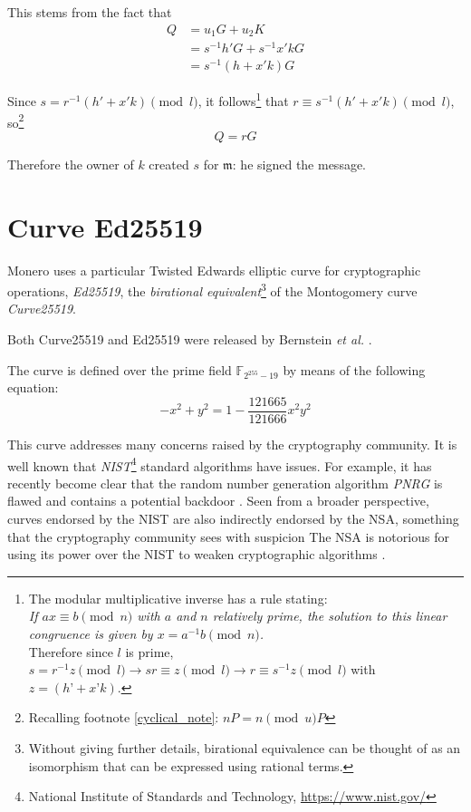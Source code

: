 This stems from the fact that
\begin{align*}
Q &= u_1 G + u_2 K \\
  &= s^{-1} h' G + s^{ -1} x' k G \\
  &= s^{-1} (h + x' k) G
\end{align*}

Since \(s = r^{-1} (h' + x' k) \pmod{l} \), it follows\footnote{\label{inverse_rule_note}The modular multiplicative inverse has a rule stating:\\
{\em If $a x \equiv b \pmod{n}$ with $a$ and $n$ relatively prime, the solution to this linear congruence is given by $x = a^{-1} b \pmod{n}$.}\\
Therefore since $l$ is prime, $s = r^{-1} z \pmod{l} \rightarrow s r \equiv z \pmod{l} \rightarrow r \equiv s^{-1}z \pmod{l}$ with $z = (h’ + x’ k)$.
}
that \(r \equiv s^{-1}(h' + x' k) \pmod{l}\), so\footnote{\label{recall1_note}Recalling footnote \ref{cyclical_note}: $n P = n \pmod{u} P$}
\[Q = r G\]

Therefore the owner of $k$ created $s$ for $\mathfrak{m}$: he signed the message.

\section{Curve Ed25519}
\label{Ed25519_section}

Monero uses a particular Twisted Edwards elliptic curve for cryptographic operations, {\em Ed25519}, the {\em birational equivalent}\footnote{\label{birational_note}Without giving further details, birational equivalence can be thought of as an isomorphism that can be expressed using rational terms.} 
of the Montogomery curve {\em Curve25519}.

Both Curve25519 and Ed25519 were released by Bernstein {\em et al.} \cite{Bernstein2008, Bernstein2012, cryptoeprint:2007:286}.

The curve is defined over the prime field \(\mathbb{F}_{2^{255} - 19} \) by means of the following equation:\\
\[ -x^2 + y^2 = 1 - \frac{121665}{121666} x^2 y^2 \]

This curve addresses many concerns raised by the cryptography community. It is well known that {\em NIST}\footnote{\label{NIST_note}National Institute of Standards and Technology, \url{https://www.nist.gov/}} 
standard algorithms have issues. For example, it has recently become clear that the random number generation algorithm {\em PNRG} is flawed and contains a potential backdoor \cite{hales2014nsa}. Seen from a broader perspective, curves endorsed by the NIST are also indirectly endorsed by the NSA, something that the cryptography community sees with suspicion The NSA is notorious for using its power over the NIST to weaken cryptographic algorithms \cite{NSA-NIST}.
\\

